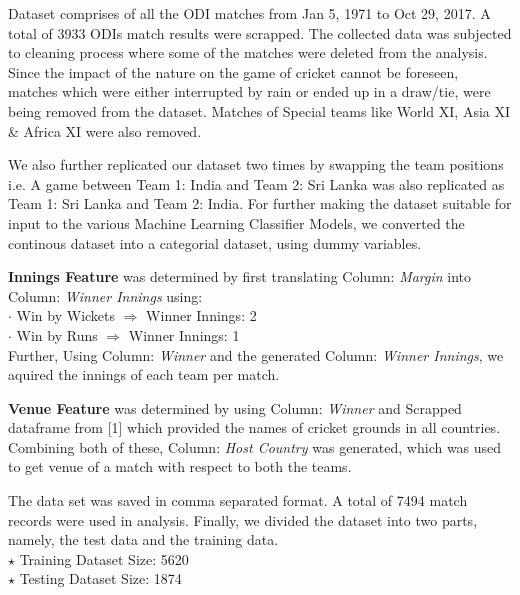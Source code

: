 \documentclass[a4paper, 10pt, conference]{IEEEtran}
\begin{document}
Dataset comprises of all the ODI matches from Jan 5, 1971 to Oct 29, 2017. A total of 3933 ODIs match results were scrapped. The collected data was subjected to cleaning process where some of the matches were deleted from the analysis. Since the impact of the nature on the game of cricket cannot be foreseen, matches which were either interrupted by rain or ended up in a draw/tie, were being removed from the dataset. Matches of Special teams like World XI, Asia XI \& Africa XI were also removed.

We also further replicated our dataset two times by swapping the team positions i.e. A game between Team 1: India and Team 2: Sri Lanka was also replicated as Team 1: Sri Lanka and Team 2: India.
For further making the dataset suitable for input to the various Machine Learning Classifier Models, we converted the continous dataset into a categorial dataset, using dummy variables.

\textbf{Innings Feature} was determined by first translating Column: \textit{Margin} into Column: \textit{Winner Innings} using:\\
\indent \indent $\cdot$ Win by Wickets  $\Longrightarrow$  Winner Innings: 2\\
\indent \indent $\cdot$ Win by Runs \indent $ \Longrightarrow$  Winner Innings: 1
\\Further, Using Column: \textit{Winner} and the generated  Column: \textit{Winner Innings}, we aquired the innings of each team per match.

\textbf{Venue Feature} was determined by using Column: \textit{Winner} and Scrapped dataframe from [1] which provided the names of cricket grounds in all countries. Combining both of these, Column: \textit{Host Country} was generated, which was used to get venue of a match with respect to both the teams.

The data set was saved in comma separated format. A total of 7494 match records were used in analysis.  Finally, we divided the dataset into two parts, namely, the test data and the training data.
\\$\star$ Training Dataset Size: 5620
\\$\star$ Testing Dataset Size: 1874
\end{document}
